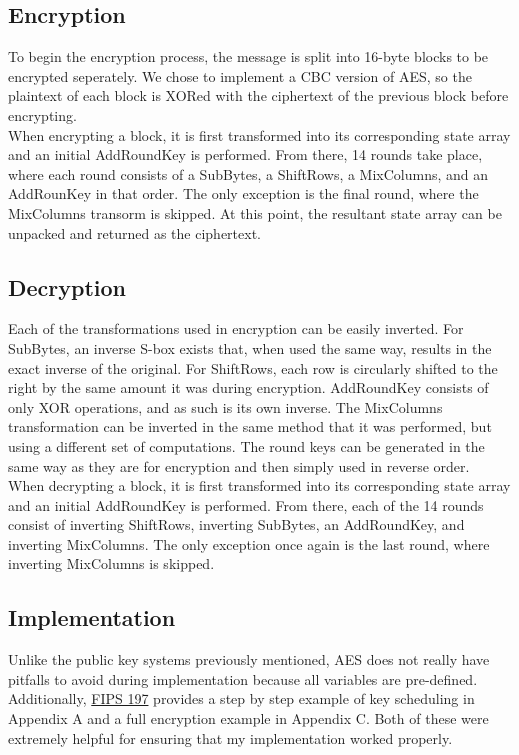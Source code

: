 	\subsection{Encryption}\label{sec:aes-encryption}
		To begin the encryption process, the message is split into 16-byte blocks to be encrypted seperately. We chose to implement a CBC version of AES, so the plaintext of each block is XORed with
		the ciphertext of the previous block before encrypting.\\

		When encrypting a block, it is first transformed into its corresponding state array and an initial AddRoundKey is performed. From there, 14 rounds take place, where each round consists of
		a SubBytes, a ShiftRows, a MixColumns, and an AddRounKey in that order. The only exception is the final round, where the MixColumns transorm is skipped. At this point, the resultant state
		array can be unpacked and returned as the ciphertext.

	\subsection{Decryption}\label{sec:aes-decryption}
		Each of the transformations used in encryption can be easily inverted. For SubBytes, an inverse S-box exists that, when used the same way, results in the exact inverse of the original. For
		ShiftRows, each row is circularly shifted to the right by the same amount it was during encryption. AddRoundKey consists of only XOR operations, and as such is its own inverse. The
		MixColumns transformation can be inverted in the same method that it was performed, but using a different set of computations. The round keys can be generated in the same way as they are
		for encryption and then simply used in reverse order.\\

		When decrypting a block, it is first transformed into its corresponding state array and an initial AddRoundKey is performed. From there, each of the 14 rounds consist of inverting ShiftRows,
		inverting SubBytes, an AddRoundKey, and inverting MixColumns. The only exception once again is the last round, where inverting MixColumns is skipped.

	\subsection{Implementation}\label{sec:aes-implementation}
		Unlike the public key systems previously mentioned, AES does not really have pitfalls to avoid during implementation because all variables are pre-defined. Additionally, 
		\href{https://nvlpubs.nist.gov/nistpubs/FIPS/NIST.FIPS.197.pdf}{FIPS 197} provides a step by step example of key scheduling in Appendix A and a full encryption example in Appendix C. Both
		of these were extremely helpful for ensuring that my implementation worked properly.
